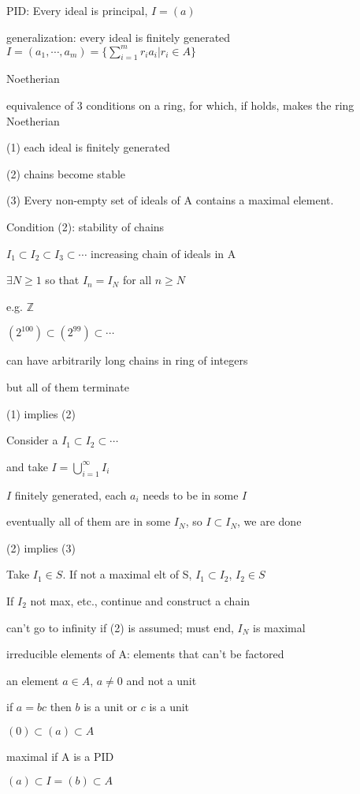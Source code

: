 \documentclass[12pt]{article}
\begin{document}
\noindent
PID: Every ideal is principal, $I = (a)$

generalization: every ideal is finitely generated $I = (a_1, \cdots, a_m) = \{\sum_{i=1}^mr_ia_i | r_i \in A\}$

Noetherian

\noindent
equivalence of 3 conditions on a ring, for which, if holds, makes the ring Noetherian

(1) each ideal is finitely generated

(2) chains become stable

(3) Every non-empty set of ideals of A contains a maximal element.

\noindent
Condition (2): stability of chains

$I_1 \subset I_2 \subset I_3 \subset \cdots$ increasing chain of ideals in A

$\exists N \geq 1$ so that $I_n = I_N$ for all $n \geq N$

\noindent
e.g. $\mathds{Z}$

$(2^{100}) \subset (2^{99}) \subset \cdots$

can have arbitrarily long chains in ring of integers

but all of them terminate

\noindent
(1) implies (2)

Consider a $I_1 \subset I_2 \subset \cdots$

and take $I = \bigcup_{i = 1}^\infty I_i$

$I$ finitely generated, each $a_i$ needs to be in some $I$

eventually all of them are in some $I_N$, so $I \subset I_N$, we are done

\noindent
(2) implies (3)

Take $I_1 \in S$.  If not a maximal elt of S, $I_1 \subset I_2$, $I_2 \in S$

If $I_2$ not max, etc., continue and construct a chain

can't go to infinity if (2) is assumed; must end, $I_N$ is maximal

\noindent
irreducible elements of A: elements that can't be factored

an element $a \in A$, $a \neq 0$ and not a unit

if $a = bc$ then $b$ is a unit or $c$ is a unit

\noindent
$(0) \subset (a) \subset A$

maximal if A is a PID

$(a) \subset I = (b) \subset A$
\end{document}
